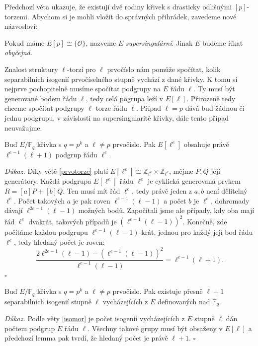 \documentclass[12pt]{report}
\begin{document}
Předchozí věta ukazuje, že existují dvě rodiny křivek s drasticky odlišnými $[p]$-torzemi. Abychom si je mohli vložit do správných přihrádek, zavedeme nové názvosloví:

\begin{definice}
Pokud máme $E[p] \cong \lbrace \mathcal{O} \rbrace $, nazveme $E$ \textit{supersingulární}. Jinak $E$ budeme říkat \textit{obyčejná}.
\end{definice}

Znalost struktury $\ell$-torzí pro $\ell$ prvočíslo nám pomůže spočítat, kolik separabilních isogenií prvočíselného stupně vychází z dané křivky. K tomu si nejprve pochopitelně musíme spočítat podgrupy na $E$ řádu $\ell$. Ty musí být generované bodem řádu $\ell$, tedy celá pogrupa leží v $E[\ell]$. Přirozeně tedy chceme spočítat podgrupy $\ell$-torze řádu $\ell$. Případ $\ell = p$ dává buď žádnou či jednu podgrupu, v závislosti na supersingularitě křivky, dále tento případ neuvažujme.
\begin{lemma}\label{bigl+1}
Buď $E/\mathbb{F}_{q}$ křivka s $q = p^k$ a $\ell \neq p$ prvočíslo. Pak $E[\ell ^e]$ obsahuje právě $\ell^{e-1} (\ell+1)$ podgrup řádu $\ell^e$.
\end{lemma}
\noindent \textit{Důkaz.} Díky větě \ref{prvotorze} platí $E[\ell^e] \cong \mathbb{Z}_{\ell ^e} \times \mathbb{Z}_{\ell ^e}$, mějme $P,Q$ její generátory. Každá podgrupa $E[\ell ^e]$ řádu $\ell^e$ je cyklická generovaná prvkem $R = [a]P+[b]Q$. Ten musí mít řád $\ell^e$, tedy právě jeden z $a,b$ není dělitelný $\ell^e$. Počet takových $a$ je pak roven $\ell^{e-1} (\ell -1)$ a počet $b$ je $\ell^e$, dohromady dávají $\ell^{2e-1} (\ell -1)$ možných bodů. Započítali jsme ale případy, kdy oba mají řád $\ell^e$ dvakrát, takových případů je $(\ell^{e-1} (\ell - 1))^2$. Konečně, zde počítáme každou podgrupu $\ell^{e-1}(\ell-1)$-krát, jednou pro každý její bod řádu $\ell^e$, tedy hledaný počet je roven:
\begin{equation*}
\frac{2 \ell^{2e-1} (\ell - 1) - (\ell^{e-1} (\ell - 1))^2}{\ell^{e-1}(\ell-1)} = \ell^{e-1} (\ell+1).
\end{equation*}
 \hfill $\square$\\

\begin{dusledek}\label{l+1}
Buď $E/\mathbb{F}_{q}$ křivka s $q = p^k$ a $\ell \neq p$ prvočíslo. Pak existuje přesně $\ell+1$ separabilních isogenií stupně $\ell$ vycházejících z $E$ definovaných nad $\overline{\mathbb{F}}_{q}$.
\end{dusledek}
\noindent \textit{Důkaz.} Podle věty \ref{isomor} je počet isogenií vycházejících z $E$ stupně $\ell$ dán počtem podgrup $E$ řádu $\ell$. Všechny takové grupy musí být obsaženy v $E[\ell]$ a předchozí lemma pak tvrdí, že hledaný počet je právě $\ell+1$. \hfill $\square$\\
\end{document}
